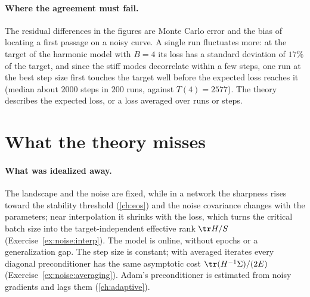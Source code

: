 \begin{refsection}
\paragraph{Where the agreement must fail.} The residual differences in the figures are Monte Carlo error and the bias of locating a first passage on a noisy curve. A single run fluctuates more: at the target of the harmonic model with $B=4$ its loss has a standard deviation of $17\%$ of the target, and since the stiff modes decorrelate within a few steps, one run at the best step size first touches the target well before the expected loss reaches it (median about $2000$ steps in $200$ runs, against $T(4)=2577$). The theory describes the expected loss, or a loss averaged over runs or steps.

\section{What the theory misses}\label{sec:noise:misses}

\paragraph{What was idealized away.} The landscape and the noise are fixed, while in a network the sharpness rises toward the stability threshold (\cref{ch:eos}) and the noise covariance changes with the parameters; near interpolation it shrinks with the loss, which turns the critical batch size into the target-independent effective rank $\tr H/S$ (Exercise~\ref{ex:noise:interp}). The model is online, without epochs or a generalization gap. The step size is constant; with averaged iterates every diagonal preconditioner has the same asymptotic cost $\tr(H^{-1}\Sigma)/(2E)$ \parencite{PolyakJuditsky1992} (Exercise~\ref{ex:noise:averaging}). Adam's preconditioner is estimated from noisy gradients and lags them (\cref{ch:adaptive}).


\end{refsection}
